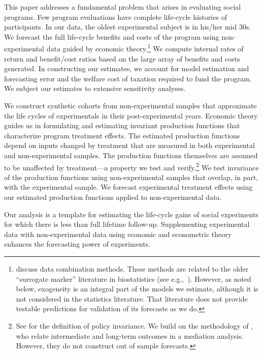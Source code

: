 This paper addresses a fundamental problem that arises in evaluating social programs. Few program evaluations have complete life-cycle histories of participants. In our data, the oldest experimental subject is in his/her mid 30s. We forecast the full life-cycle benefits and costs of the program using non-experimental data guided by economic theory.\footnote{\citet{Ridder_Moffitt_2007_hbk_metricsdata} discuss data combination methods. These methods are related to the older ``surrogate marker'' literature in biostatistics (see e.g.,\ \citealp{Prentice_1989_Surrogate_SiM}). However, as noted below, exogeneity is an integral part of the models we estimate, although it is not considered in the statistics literature. That literature does not provide testable predictions for validation of its forecasts as we do.} We compute internal rates of return and benefit/cost ratios based on the large array of benefits and costs generated. In constructing our estimates, we account for model estimation and forecasting error and the welfare cost of taxation required to fund the program. We subject our estimates to extensive sensitivity analyses.

We construct synthetic cohorts from non-experimental samples that approximate the life cycles of experimentals in their post-experimental years. Economic theory guides us in formulating and estimating invariant production functions that characterize program treatment effects. The estimated production functions depend on inputs changed by treatment that are measured in both experimental and non-experimental samples. The production functions themselves are assumed to be unaffected by treatment---a property we test and verify.\footnote{See \cite{Hurwicz_1962_structural} for the definition of policy invariance. We build on the methodology of \citet{Heckman_Pinto_etal_2013_PerryFactor}, who relate intermediate and long-term outcomes in a mediation analysis. However, they do not construct out of sample forecasts.} We test invariance of the production functions using non-experimental samples that overlap, in part, with the experimental sample. We forecast experimental treatment effects using our estimated production functions applied to non-experimental data.

Our analysis is a template for estimating the life-cycle gains of social experiments for which there is less than full lifetime follow-up. Supplementing experimental data with non-experimental data using economic and econometric theory enhances the forecasting power of experiments. 

